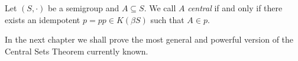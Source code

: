 \begin{defn}
  Let $(S, \cdot)$ be a semigroup and $A \subseteq S$.
  We call $A$ \emph{central} if and only if there exists an idempotent $p = pp \in K(\beta S)$ such that $A \in p$.
\end{defn}

In the next chapter we shall prove the most general and powerful version of the Central Sets Theorem currently known.

\theendnotes

